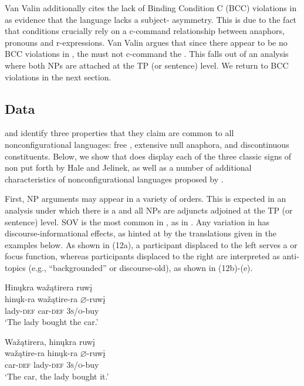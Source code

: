 \documentclass[output=paper]{LSP/langsci}
\begin{document}
Van Valin additionally cites the lack of Binding Condition C (BCC) violations in  as evidence that the language lacks a subject- asymmetry.  This is due to the fact that  conditions crucially rely on a c-command relationship between anaphors, pronouns and r-expressions.  Van Valin argues that since there appear to be no BCC violations in , the  must not c-command the . This falls out of an analysis where both NPs are attached at the TP (or sentence) level. We return to BCC violations in the next section.

\subsection{ Data}\label{sec:jrs:2.3}

\citet{Hale1983} and \citet{Jelinek1984} identify three properties that they claim are common to all nonconfigurational languages: free , extensive null anaphora, and discontinuous constituents. Below, we show that  does display each of the three classic signs of non put forth by Hale and Jelinek, as well as a number of additional characteristics of nonconfigurational languages proposed by \citet{Baker1996}.  

First, NP arguments may appear in a variety of orders.  This is expected in an analysis under which there is a  and all NPs are adjuncts adjoined at the TP (or sentence) level. SOV  is the most common in , as in . Any variation in  has discourse-informational effects, as hinted at by the  translations given in the examples below. As shown in (12a), a participant displaced to the left serves a  or focus function, whereas participants displaced to the right are interpreted as anti-topics (e.g., ``backgrounded'' or discourse-old), as shown in (12b)-(e).

\ea
\label{ex:jrs:11} 
\glll Hin\k{u}kra wa\v{z}ątirera ruw\k{i}  \\
hin\k{u}k-ra	wa\v{z}ątire-ra 	$\varnothing$-ruw\k{i} \\
lady-\textsc{def}	car-\textsc{def}	 \textsc{3s/o}-buy \\
\trans `The lady bought the car.'
\z

\ea\label{ex:jrs:12}
\ex
\glll Wa\v{z}ątirera,	hin\k{u}kra		ruw\k{i} \\
wa\v{z}ątire-ra 	hin\k{u}k-ra		$\varnothing$-ruw\k{i} \\
car-\textsc{def}			lady-\textsc{def}		\textsc{3s/o}-buy \\
\trans `The car, the lady bought it.' 
\end{document}
